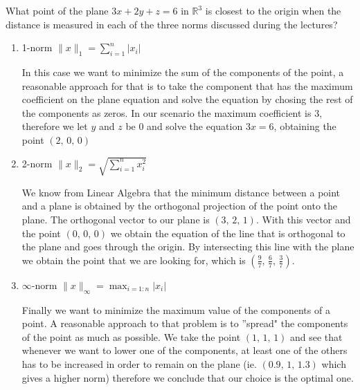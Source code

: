 \begin{problem}
What point of the plane $3x + 2y+ z = 6$ in $\mathbb{R}^3$ is closest to the origin when the distance is measured in each of the three norms discussed during the lectures?
\end{problem}

\begin{solution}
\begin{enumerate}
	\item 1-norm $\lVert x \rVert_1 = \sum_{i = 1}^n \lvert x_i \rvert$
	
	In this case we want to minimize the sum of the components of the point, a reasonable approach for that is to take the component that has the maximum coefficient on the plane equation and solve the equation by chosing the rest of the components as zeros. In our scenario the maximum coefficient is 3, therefore we let $y$ and $z$ be 0 and solve the equation $3x = 6$, obtaining the point $(2,\, 0,\, 0)$
	
	\item 2-norm $\lVert x \rVert_2 = \sqrt{\sum_{i = 1}^n x_i^2}$
	
	We know from Linear Algebra that the minimum distance between a point and a plane is obtained by the orthogonal projection of the point onto the plane. The orthogonal vector to our plane is $(3,\, 2,\, 1)$. With this vector and the point $(0,\,0,\,0)$ we obtain the equation of the line that is orthogonal to the plane and goes through the origin. By intersecting this line with the plane we obtain the point that we are looking for, which is $(\frac{9}{7},\, \frac{6}{7},\,\frac{3}{7})$.
	\item $\infty$-norm $\lVert x \rVert_{\infty} = \max_{i = 1:n} \lvert x_i \rvert$
	
	Finally we want to minimize the maximum value of the components of a point. A reasonable approach to that problem is to ''spread" the components of the point as much as possible. We take the point $(1,\, 1,\, 1)$ and see that whenever we want to lower one of the components, at least one of the others has to be increased in order to remain on the plane (ie. $(0.9,\, 1,\, 1.3)$ which gives a higher norm) therefore we conclude that our choice is the optimal one.
\end{enumerate}
\end{solution}


